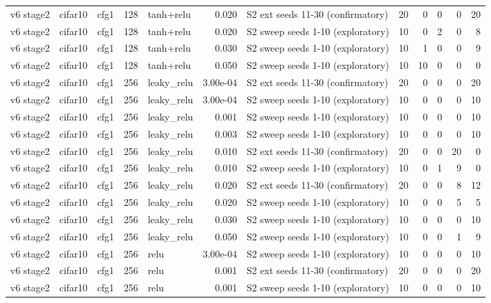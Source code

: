 \begin{table}[htbp]
{\begin{tabular}{@{}lllrlrlrrrrr@{}}
v6 stage2 & cifar10 & cfg1 & 128 & tanh+relu & 0.020 & S2 ext seeds 11-30 (confirmatory) & 20 & 0 & 0 & 0 & 20 \\
v6 stage2 & cifar10 & cfg1 & 128 & tanh+relu & 0.020 & S2 sweep seeds 1-10 (exploratory) & 10 & 0 & 2 & 0 & 8 \\
v6 stage2 & cifar10 & cfg1 & 128 & tanh+relu & 0.030 & S2 sweep seeds 1-10 (exploratory) & 10 & 1 & 0 & 0 & 9 \\
v6 stage2 & cifar10 & cfg1 & 128 & tanh+relu & 0.050 & S2 sweep seeds 1-10 (exploratory) & 10 & 10 & 0 & 0 & 0 \\
v6 stage2 & cifar10 & cfg1 & 256 & leaky\_relu & 3.00e-04 & S2 ext seeds 11-30 (confirmatory) & 20 & 0 & 0 & 0 & 20 \\
v6 stage2 & cifar10 & cfg1 & 256 & leaky\_relu & 3.00e-04 & S2 sweep seeds 1-10 (exploratory) & 10 & 0 & 0 & 0 & 10 \\
v6 stage2 & cifar10 & cfg1 & 256 & leaky\_relu & 0.001 & S2 sweep seeds 1-10 (exploratory) & 10 & 0 & 0 & 0 & 10 \\
v6 stage2 & cifar10 & cfg1 & 256 & leaky\_relu & 0.003 & S2 sweep seeds 1-10 (exploratory) & 10 & 0 & 0 & 0 & 10 \\
v6 stage2 & cifar10 & cfg1 & 256 & leaky\_relu & 0.010 & S2 ext seeds 11-30 (confirmatory) & 20 & 0 & 0 & 20 & 0 \\
v6 stage2 & cifar10 & cfg1 & 256 & leaky\_relu & 0.010 & S2 sweep seeds 1-10 (exploratory) & 10 & 0 & 1 & 9 & 0 \\
v6 stage2 & cifar10 & cfg1 & 256 & leaky\_relu & 0.020 & S2 ext seeds 11-30 (confirmatory) & 20 & 0 & 0 & 8 & 12 \\
v6 stage2 & cifar10 & cfg1 & 256 & leaky\_relu & 0.020 & S2 sweep seeds 1-10 (exploratory) & 10 & 0 & 0 & 5 & 5 \\
v6 stage2 & cifar10 & cfg1 & 256 & leaky\_relu & 0.030 & S2 sweep seeds 1-10 (exploratory) & 10 & 0 & 0 & 0 & 10 \\
v6 stage2 & cifar10 & cfg1 & 256 & leaky\_relu & 0.050 & S2 sweep seeds 1-10 (exploratory) & 10 & 0 & 0 & 1 & 9 \\
v6 stage2 & cifar10 & cfg1 & 256 & relu & 3.00e-04 & S2 sweep seeds 1-10 (exploratory) & 10 & 0 & 0 & 0 & 10 \\
v6 stage2 & cifar10 & cfg1 & 256 & relu & 0.001 & S2 ext seeds 11-30 (confirmatory) & 20 & 0 & 0 & 0 & 20 \\
v6 stage2 & cifar10 & cfg1 & 256 & relu & 0.001 & S2 sweep seeds 1-10 (exploratory) & 10 & 0 & 0 & 0 & 10 \\

\end{tabular}}
\end{table}
